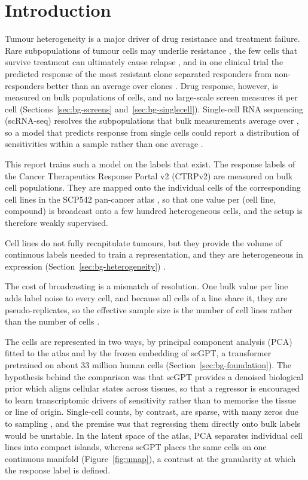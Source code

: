 \chapter{Introduction}

Tumour heterogeneity is a major driver of drug resistance and treatment failure. Rare subpopulations of
tumour cells may underlie resistance \cite{scp542}, the few cells that survive treatment can ultimately
cause relapse \cite{scdeal}, and in one clinical trial the predicted response of the most resistant clone
separated responders from non-responders better than an average over clones \cite{perception}. Drug
response, however, is measured on bulk populations of cells, and no large-scale screen measures it per
cell (Sections~\ref{sec:bg-screens} and~\ref{sec:bg-singlecell}). Single-cell RNA sequencing (scRNA-seq)
resolves the subpopulations that bulk measurements average over \cite{luecken2019}, so a model that
predicts response from single cells could report a distribution of sensitivities within a sample rather
than one average \cite{perception,scdeal}.

This report trains such a model on the labels that exist. The response labels of the Cancer Therapeutics
Response Portal v2 (CTRPv2) \cite{ctrpv2,ctrp_rees} are measured on bulk cell populations. They are mapped onto the individual
cells of the corresponding cell lines in the SCP542 pan-cancer atlas \cite{scp542}, so that one value per
(cell line, compound) is broadcast onto a few hundred heterogeneous cells, and the setup is therefore
weakly supervised.

Cell lines do not fully recapitulate tumours, but they provide the volume of
continuous labels needed to train a representation, and they are heterogeneous in expression
(Section~\ref{sec:bg-heterogeneity}) \cite{scp542}.

The cost of broadcasting is a mismatch of resolution. One bulk value per line adds label noise to every
cell, and because all cells of a line share it, they are pseudo-replicates, so the effective sample size
is the number of cell lines rather than the number of cells \cite{lazic2010,dreval}.

The cells are represented in two ways, by principal component analysis (PCA) fitted to the atlas
\cite{jolliffe2016,luecken2019} and by the frozen embedding of scGPT, a transformer pretrained on about
33 million human cells \cite{scgpt} (Section~\ref{sec:bg-foundation}). The hypothesis behind the
comparison was that scGPT provides a denoised biological prior which aligns cellular states across
tissues, so that a regressor is encouraged to learn transcriptomic drivers of sensitivity rather than to
memorise the tissue or line of origin. Single-cell counts, by contrast, are sparse, with many zeros due to
sampling \cite{luecken2019}, and the premise was that regressing them directly onto bulk labels would be
unstable. In the latent space of the atlas, PCA separates individual cell lines into compact islands,
whereas scGPT places the same cells on one continuous manifold (Figure~\ref{fig:umap}), a contrast at the
granularity at which the response label is defined.

